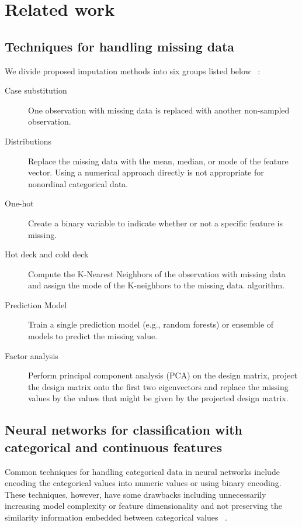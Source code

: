\documentclass[10pt,twocolumn,letterpaper]{article}
\begin{document}
\section{Related work}  \label{section:rw}

\subsection{Techniques for handling missing data} \label{section:techniques}
We divide proposed  imputation methods into six groups listed
below ~\cite{batista2003analysis}:

\begin{description}
\item[Case substitution] One observation with missing data is replaced with
another non-sampled observation.
\item[Distributions] Replace the missing data with the mean, median, or mode of
    the feature vector. Using a numerical approach directly is not appropriate for nonordinal categorical data.
\item[One-hot] Create a binary variable to indicate whether or not a specific
    feature is missing. %
\item[Hot deck and cold deck] Compute the K-Nearest Neighbors of the
    observation with missing data and assign the mode of the K-neighbors
    to the missing data. %
    algorithm.
\item[Prediction Model] Train a single prediction model (e.g., random forests) or ensemble of models to predict the missing value. %
\item[Factor analysis] Perform principal component analysis (PCA) on the design
    matrix, project the design matrix onto the first two eigenvectors and
    replace the missing values by the values that might be given by the
    projected design matrix.
\end{description}

\subsection{Neural networks for classification with categorical and
continuous features}  Common techniques for handling categorical data in
neural networks include encoding the categorical values into numeric values
or using binary encoding. These techniques, however, have some drawbacks
including unnecessarily increasing model complexity or feature dimensionality
and not preserving the similarity information embedded between categorical
values ~\cite{hsu2006generalizing}.\\
\end{document}
